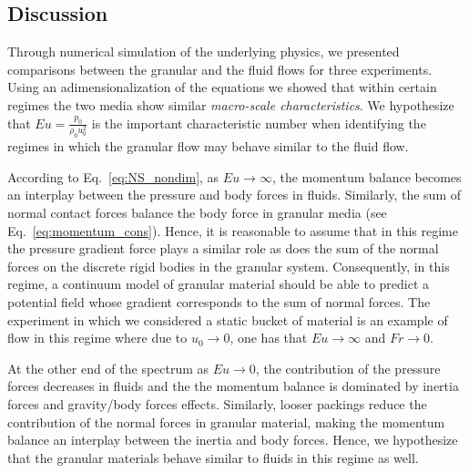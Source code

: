 \subsection{Discussion}\label{CFD_DEM_discussion}
Through numerical simulation of the underlying physics, we presented comparisons between the granular and the fluid flows for three experiments. Using an adimensionalization of the equations we showed that within certain regimes the two media show similar \textit{macro-scale characteristics}. We hypothesize that $Eu=\frac{p_0}{\rho_0 u_0^2}$ is the important characteristic number when identifying the regimes in which the granular flow may behave similar to the fluid flow. 

According to Eq.~\ref{eq:NS_nondim}, as $Eu\to\infty$, the momentum balance becomes an interplay between the pressure and body forces in fluids. Similarly, the sum of normal contact forces balance the body force in granular media (see Eq.~\ref{eq:momentum_cons}). Hence, it is reasonable to assume that in this regime the pressure gradient force plays a similar role as does the sum of the normal forces on the discrete rigid bodies in the granular system.  Consequently, in this regime, a continuum model of granular material should be able to predict a potential field whose gradient corresponds to the sum of normal forces. The experiment in which we considered a static bucket of material is an example of flow in this regime where due to $u_0 \to 0$, one has that $Eu\to\infty$ and $Fr\to 0$.

At the other end of the spectrum as $Eu \to 0$, the contribution of the pressure forces decreases in fluids and the the momentum balance is dominated by inertia forces and gravity/body forces effects. Similarly, looser packings reduce the contribution of the normal forces in granular material, making the momentum balance an interplay between the inertia and body forces. Hence, we hypothesize that the granular materials behave similar to fluids in this regime as well.




